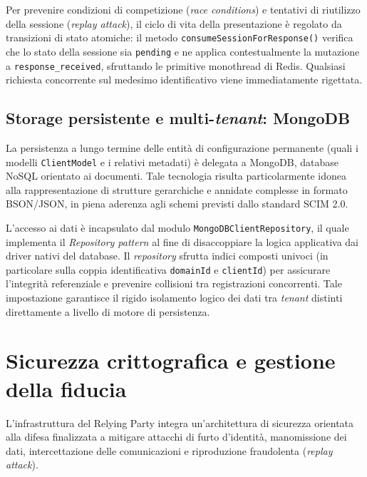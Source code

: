Per prevenire condizioni di competizione (\textit{race conditions}) e tentativi di riutilizzo della sessione (\textit{replay attack}\glsfirstoccur{}), il ciclo di vita della presentazione è regolato da transizioni di stato atomiche: il metodo \texttt{consumeSessionForResponse()} verifica che lo stato della sessione sia \texttt{pending} e ne applica contestualmente la mutazione a \texttt{response\_\allowbreak{}received}, sfruttando le primitive monothread di Redis. Qualsiasi richiesta concorrente sul medesimo identificativo viene immediatamente rigettata.

\subsection{Storage persistente e multi-\textit{tenant}: MongoDB}
La persistenza a lungo termine delle entità di configurazione permanente (quali i modelli \texttt{ClientModel} e i relativi metadati) è delegata a MongoDB, database NoSQL orientato ai documenti. Tale tecnologia risulta particolarmente idonea alla rappresentazione di strutture gerarchiche e annidate complesse in formato BSON/JSON, in piena aderenza agli schemi previsti dallo standard SCIM 2.0.

L'accesso ai dati è incapsulato dal modulo \texttt{MongoDBClientRepository}, il quale implementa il \textit{Repository pattern} al fine di disaccoppiare la logica applicativa dai driver nativi del database. Il \textit{repository} sfrutta indici composti univoci (in particolare sulla coppia identificativa \texttt{domainId} e \texttt{clientId}) per assicurare l'integrità referenziale e prevenire collisioni tra registrazioni concorrenti. Tale impostazione garantisce il rigido isolamento logico dei dati tra \textit{tenant} distinti direttamente a livello di motore di persistenza.

\section{Sicurezza crittografica e gestione della fiducia}
\label{sec:sicurezza_crittografica}
L'infrastruttura del Relying Party integra un'architettura di sicurezza orientata alla difesa finalizzata a mitigare attacchi di furto d'identità, manomissione dei dati, intercettazione delle comunicazioni e riproduzione fraudolenta (\textit{replay attack}).

